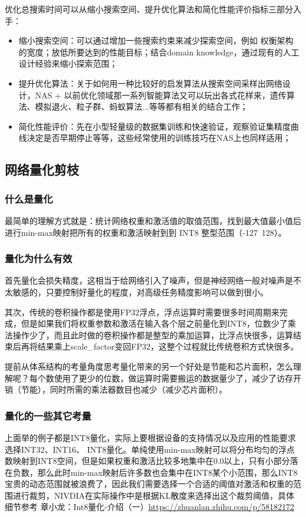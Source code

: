 \documentclass[12pt]{article}
\begin{document}
优化总搜索时间可以从缩小搜索空间、提升优化算法和简化性能评价指标三部分入手：
\begin{itemize}
\setlength{\itemsep}{0pt}
\setlength{\parsep}{0pt}
\setlength{\parskip}{0pt}
    \item 缩小搜索空间：可以通过增加一些搜索约束来减少探索空间，例如 权衡架构的宽度；放低所要达到的性能目标；结合domain knowledge，通过现有的人工设计经验来缩小探索范围；
    \item 提升优化算法：关于如何用一种比较好的启发算法从搜索空间采样出网络设计，NAS + 以前优化领域那一系列智能算法又可以玩出各式花样来，遗传算法、模拟退火、粒子群、蚂蚁算法...等等都有相关的结合工作；
    \item 简化性能评价：先在小型轻量级的数据集训练和快速验证，观察验证集精度曲线决定是否早期停止等等，这些经常使用的训练技巧在NAS上也同样适用；
\end{itemize}

\subsection{网络量化剪枝}
\subsubsection{什么是量化}
最简单的理解方式就是：统计网络权重和激活值的取值范围，找到最大值最小值后进行min-max映射把所有的权重和激活映射到到 INT8 整型范围（-127~128）。

\subsubsection{量化为什么有效}
首先量化会损失精度，这相当于给网络引入了噪声，但是神经网络一般对噪声是不太敏感的，只要控制好量化的程度，对高级任务精度影响可以做到很小。

其次，传统的卷积操作都是使用FP32浮点，浮点运算时需要很多时间周期来完成，但是如果我们将权重参数和激活在输入各个层之前量化到INT8，位数少了乘法操作少了，而且此时做的卷积操作都是整型的乘加运算，比浮点快很多，运算结束后再将结果乘上scale\_factor变回FP32，这整个过程就比传统卷积方式快很多。

提前从体系结构的考量角度思考量化带来的另一个好处是节能和芯片面积，怎么理解呢？每个数使用了更少的位数，做运算时需要搬运的数据量少了，减少了访存开销（节能），同时所需的乘法器数目也减少（减少芯片面积）。


\subsubsection{量化的一些其它考量}
上面举的例子都是INT8量化，实际上要根据设备的支持情况以及应用的性能要求选择INT32、INT16、 INT8量化。单纯使用min-max映射可以将分布均匀的浮点数映射到INT8空间，但是如果权重和激活比较多地集中在0.0以上，只有小部分落在负数，那么此时min-max映射后许多数也会集中在INT8某个小范围，那么INT8宝贵的动态范围就被浪费了，因此我们需要选择一个合适的阈值对激活和权重的范围进行裁剪，NIVDIA在实际操作中是根据KL散度来选择出这个裁剪阈值，具体细节参考 章小龙：Int8量化-介绍（一）\url{https://zhuanlan.zhihu.com/p/58182172}
\end{document}
